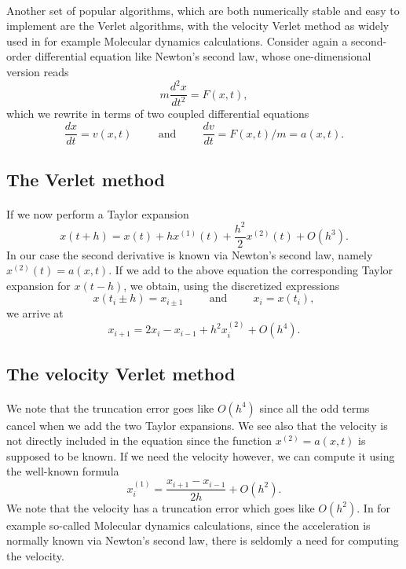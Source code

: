 \documentclass[%
oneside,                 %
final,                   %
10pt]{article}
\begin{document}
\paragraph{}
Another set of popular algorithms, which are both numerically stable and easy to implement are the
Verlet algorithms, with the velocity Verlet method as widely used in for example Molecular dynamics calculations. 
Consider again a second-order differential equation  like Newton's second law, whose one-dimensional
version reads
\[
m\frac{d^2 x}{dt^2}= F(x,t),
\]
which we rewrite in terms of two coupled differential equations
\[
\frac{dx}{dt}=v(x,t) \hspace{1cm}\mathrm{and}\hspace{1cm} \frac{dv}{dt}=F(x,t)/m=a(x,t).
\]



\subsection*{The Verlet method}

\paragraph{}
If we now perform a Taylor expansion
\[
x(t+h) = x(t)+hx^{(1)}(t)+\frac{h^2}{2}x^{(2)}(t)+O(h^3).
\]
In our case the second derivative is known via Newton's second law, namely $x^{(2)}(t)=a(x,t)$.
If we add to the above equation the corresponding Taylor expansion for $x(t-h)$, we obtain, using the
discretized expressions
\[
x(t_i\pm h) = x_{i\pm 1} \hspace{1cm}\mathrm{and}\hspace{1cm} x_i=x(t_i),
\]
we arrive at 
\[
x_{i+1} = 2x_i - x_{i-1} +h^2x^{(2)}_i+O(h^4).
\]




\subsection*{The velocity Verlet method}

\paragraph{}
We note that the truncation error goes like $O(h^4)$ since all the odd terms cancel when we add the two Taylor expansions.
We see also that the velocity is not directly included in the equation since the function
$x^{(2)}=a(x,t)$ is supposed to be known. If we need the velocity however, we can compute it using the well-known
formula
\[
x^{(1)}_i=\frac{x_{i+1}-x_{i-1}}{2h}+O(h^2).
\]
We note that the velocity has a truncation error which goes like $O(h^2)$. In for example so-called Molecular dynamics calculations,
since the acceleration is normally known via Newton's second law, there is seldomly a need for computing the velocity.
\end{document}
